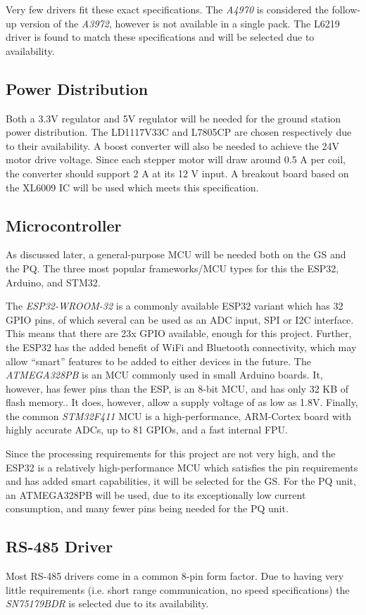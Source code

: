Very few drivers fit these exact specifications. The \textit{A4970} is considered the follow-up version of the \textit{A3972}, however is not available in a single pack. The L6219 driver is found to match these specifications and will be selected due to availability.

\subsection{Power Distribution}
Both a 3.3V regulator and 5V regulator will be needed for the ground station power distribution. The LD1117V33C and L7805CP are chosen respectively due to their availability. A boost converter will also be needed to achieve the 24V motor drive voltage. Since each stepper motor will draw around 0.5 A per coil, the converter should support 2 A at its 12 V input. A breakout board based on the XL6009 IC will be used which meets this specification.

\subsection{Microcontroller}
As discussed later, a general-purpose MCU will be needed both on the GS and the PQ. The three most popular frameworks/MCU types for this the ESP32, Arduino, and STM32.

The \textit{ESP32-WROOM-32} is a commonly available ESP32 variant which has 32 GPIO pins, of which several can be used as an ADC input, SPI or I2C interface. This means that there are 23x GPIO available, enough for this project. Further, the ESP32 has the added benefit of WiFi and Bluetooth connectivity, which may allow “smart” features to be added to either devices in the future. The \textit{ATMEGA328PB} is an MCU commonly used in small Arduino boards. It, however, has fewer pins than the ESP, is an 8-bit MCU, and has only 32 KB of flash memory.. It does, however, allow a supply  voltage of as low as 1.8V. Finally, the common \textit{STM32F411} MCU is a high-performance, ARM-Cortex board with highly accurate ADCs, up to 81 GPIOs, and a fast internal FPU.

Since the processing requirements for this project are not very high, and the ESP32 is a relatively high-performance MCU which satisfies the pin requirements and has added smart capabilities, it will be selected for the GS. For the PQ unit, an ATMEGA328PB will be used, due to its exceptionally low current consumption, and many fewer pins being needed for the PQ unit.

\subsection{RS-485 Driver}
Most RS-485 drivers come in a common 8-pin form factor. Due to having very little requirements (i.e. short range communication, no speed specifications) the \textit{SN75179BDR} is selected due to its availability.